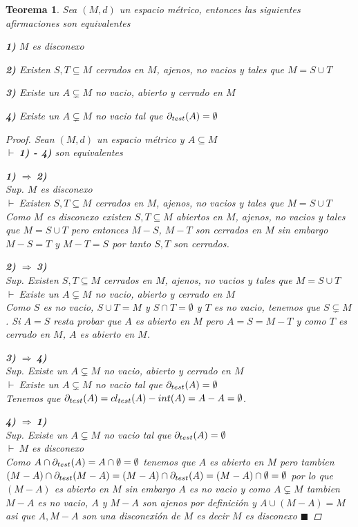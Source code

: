 \documentclass[oneside]{book} %
\theoremstyle{Teorema}
\newtheorem{Teorema}[Definicion]{Teorema}
\theoremstyle{Ejemplos}
\theoremstyle{[Obs]}
\def \test {test}
\newcommand{\cerradura}[2][\test]{\ifx \test #1 {\overline{#2}} \else {cl_{#1}(#2)} \fi} %
\newcommand{\frontera}[2][\test]{\ifx \test #1 {\partial(#2)} \else {\partial_{#1}(#2)} \fi} %
\renewcommand{\{}{\left\lbrace} %
\renewcommand{\}}{\right\rbrace} %
\renewcommand{\u}{\cup} %
\newcommand{\n}{\cap} %
\renewcommand{\sc}{\subseteq} %
\newcommand{\scp}{\subsetneq} %
\renewcommand{\qed}{$\blacksquare$} %
\newcommand{\pd}{$\vdash\ $} %
\newcommand{\Imp}{$\Rightarrow\ $} %
\begin{document}
			\begin{Teorema}\setlength{\parindent}{0em}
			
				Sea $(M, d)$ un espacio métrico, entonces las siguientes afirmaciones son equivalentes

				\textbf{1)} $M$ es disconexo 

				\textbf{2)} Existen $S, T \sc M$ cerrados en $M$, ajenos, no vacios y tales que $M = S \u T$

				\textbf{3)} Existe un $A \scp M$ no vacio, abierto y cerrado en $M$ 

				\textbf{4)} Existe un $A \scp M$ no vacio tal que $\frontera{A} = \emptyset$

				\begin{proof}
					
					Sean $(M, d)$ un espacio métrico y $A \sc M$ \\ 
					\pd \textbf{1) - 4)} son equivalentes 

					\textbf{1)} \Imp \textbf{2)} \\ 
					Sup. $M$ es disconexo \\ 
					\pd Existen $S, T \sc M$ cerrados en $M$, ajenos, no vacios y tales que $M = S \u T$ \\ 
					Como $M$ es disconexo existen $S, T \sc M$ abiertos en $M$, ajenos, no vacios y tales que $M = S \u T$ pero entonces $M - S$, $M - T$ son cerrados en $M$ sin embargo $M - S = T$ y $M - T = S$ por tanto $S, T$ son cerrados. 

					\textbf{2)} \Imp \textbf{3)} \\ 
					Sup. Existen $S, T \sc M$ cerrados en $M$, ajenos, no vacios y tales que $M = S \u T$ \\ 
					\pd Existe un $A \scp M$ no vacio, abierto y cerrado en $M$ \\ 
					Como $S$ es no vacio, $S \u T = M$ y $S \n T = \emptyset$ y $T$ es no vacio, tenemos que $S \scp M$. Si $A = S$ resta probar que $A$ es abierto en $M$ pero $A = S = M - T$ y como $T$ es cerrado en $M$, $A$ es abierto en $M$.

					\textbf{3)} \Imp \textbf{4)} \\ 
					Sup. Existe un $A \scp M$ no vacio, abierto y cerrado en $M$ \\ 
					\pd Existe un $A \scp M$ no vacio tal que $\frontera{A} = \emptyset$ \\ 
					Tenemos que $\frontera{A} = \cerradura{A} - int(A) = A - A = \emptyset$. 

					\textbf{4)} \Imp \textbf{1)} \\ 
					Sup. Existe un $A \scp M$ no vacio tal que $\frontera{A} = \emptyset$ \\ 
					\pd $M$ es disconexo \\ 
					Como $A \n \frontera{A} = A \n \emptyset = \emptyset$ tenemos que $A$ es abierto en $M$ pero tambien $(M - A) \n \frontera{M - A} = (M - A) \n \frontera{A} = (M - A) \n \emptyset = \emptyset$ por lo que $(M - A)$ es abierto en $M$ sin embargo $A$ es no vacio y como $A \scp M$ tambien $M - A$ es no vacio, $A$ y $M - A$ son ajenos por definición y $A \u (M - A) = M$ asi que $A, M - A$ son una disconexión de $M$ es decir $M$ es disconexo \qed


\end{proof}
\end{Teorema}
\end{document}
